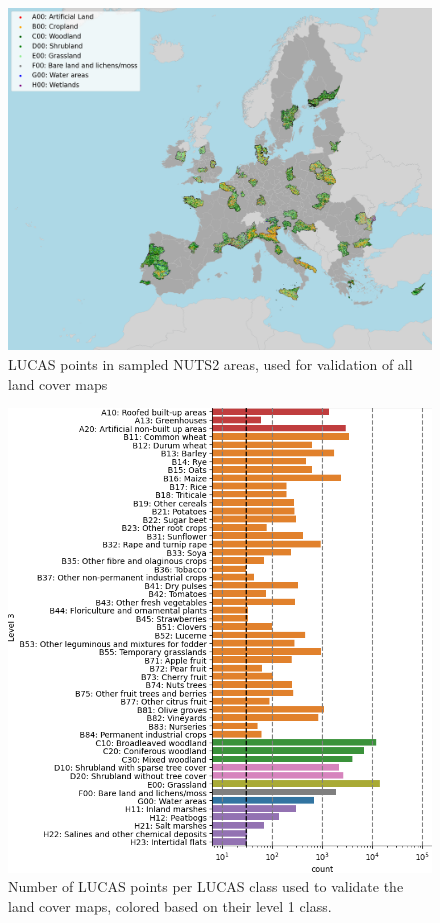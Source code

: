     \begin{figure}[h]
    \centering
    \includegraphics[width=\textwidth]{figs_05/fig_lucas_aoi.png}
    \caption{LUCAS points in sampled NUTS2 areas, used for validation of all land cover maps}
    \label{fig:05_lucas_aoi}
    \end{figure}
    
    \begin{figure}[h]
    \centering
    \includegraphics[width=\textwidth]{figs_05/fig_lucas_aoi_counts.png}
    \caption{Number of LUCAS points per LUCAS class used to validate the land cover maps, colored based on their level 1 class.}
    \label{fig:05_lucas_aoi_counts}
    \end{figure}

